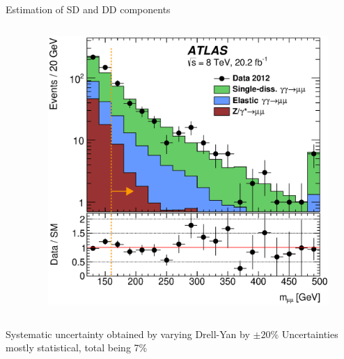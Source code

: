 \documentclass[10pt]{beamer}
\begin{document}
\begin{frame}{Estimation of SD and DD components}
\begin{columns}
\begin{column}{0.5\linewidth}
	\end{column}
	\begin{column}{0.5\linewidth}
\begin{figure}
 \includegraphics[width=\linewidth]{figures/flux_m160mumu.eps} 
\end{figure}
	\end{column}
\end{columns}
\begin{outline}
\1 Systematic uncertainty obtained by varying Drell-Yan by $\pm20\%$
\1 Uncertainties mostly statistical, total being 7\%
\end{outline}
\end{frame}
\end{document}
